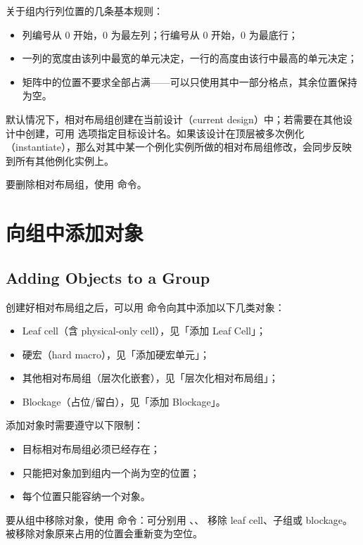 关于组内行列位置的几条基本规则：
\begin{itemize}
  \item 列编号从 0 开始，0 为最左列；行编号从 0 开始，0 为最底行；
  \item 一列的宽度由该列中最宽的单元决定，一行的高度由该行中最高的单元决定；
  \item 矩阵中的位置不要求全部占满——可以只使用其中一部分格点，其余位置保持为空。
\end{itemize}

默认情况下，相对布局组创建在当前设计（current design）中；若需要在其他设计中创建，可用  选项指定目标设计名。如果该设计在顶层被多次例化（instantiate），那么对其中某一个例化实例所做的相对布局组修改，会同步反映到所有其他例化实例上。

要删除相对布局组，使用  命令。

\section{向组中添加对象}
\subsection*{Adding Objects to a Group}

创建好相对布局组之后，可以用  命令向其中添加以下几类对象：
\begin{itemize}
  \item Leaf cell（含 physical-only cell），见「添加 Leaf Cell」；
  \item 硬宏（hard macro），见「添加硬宏单元」；
  \item 其他相对布局组（层次化嵌套），见「层次化相对布局组」；
  \item Blockage（占位/留白），见「添加 Blockage」。
\end{itemize}

添加对象时需要遵守以下限制：
\begin{itemize}
  \item 目标相对布局组必须已经存在；
  \item 只能把对象加到组内一个尚为空的位置；
  \item 每个位置只能容纳一个对象。
\end{itemize}

要从组中移除对象，使用  命令：可分别用 、、 移除 leaf cell、子组或 blockage。被移除对象原来占用的位置会重新变为空位。

